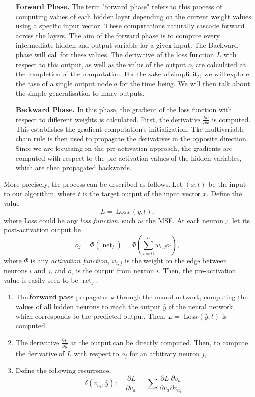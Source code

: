 \documentclass{tufte-handout}
\DeclareMathOperator{\net}{net}
\begin{document}
  \begin{enumerate}
    \item[\bf Forward Phase.] The term "forward phase" refers to this process of computing values of each hidden layer depending on the current weight values using a specific input vector. These computations naturally cascade forward across the layers. The aim of the forward phase is to compute every intermediate hidden and output variable for a given input. The Backward phase will call for these values. The derivative of the loss function $L$ with respect to this output, as well as the value of the output $o$, are calculated at the completion of the computation. For the sake of simplicity, we will explore the case of a single output node $o$ for the time being. We will then talk about the simple generalisation to many outputs. 

    \item[\bf Backward Phase.] In this phase, the gradient of the loss function with respect to different weights is calculated. First, the derivative $\frac{\partial {o}}{\partial {w}} {}$ is computed. This establishes the gradient computation's initialization. The multivariable chain rule is then used to propagate the derivatives in the opposite direction. Since we are focussing on the pre-activation approach, the gradients are computed with respect to the pre-activation values of the hidden variables, which are then propagated backwards.
  \end{enumerate}
  More precisely, the process can be described as follows. Let $(x,t)$ be the input to our algorithm, where $t$ is the target output of the input vector $x.$ Define the value
  $$L = \operatorname{Loss}(y,t),$$
  where Loss could be any \textit{loss function}, such as the MSE. At each neuron $j$, let its post-activation output be 
  $$o_j = \Phi (\net_j) = \Phi \left( \sum^{n}_{i=0}w_{i,j} o_i  \right) , $$
  where $\Phi$ is any \textit{activation function}, $w_{i,j}$ is the weight on the edge between neurons $i$ and $j$, and $o_i$ is the output from neuron $i.$ Then, the pre-activation value is easily seen to be $\net_j$.

  \begin{enumerate}
    \item The \textbf{forward pass} propagates $x$ through the neural network, computing the values of all hidden neurons to reach the output $\hat y$ of the neural network, which corresponds to the predicted output. Then, $L = \operatorname{Loss}(\hat y, t)$  is computed.
    \item The derivative $\frac{\partial {L}}{\partial {\hat y}}$ at the output can be directly computed. Then, to compute the derivative of $L$ with respect to $o_j$ for an arbitrary neuron $j$, 

    \item Define the following recurrence, 
    $$\delta (v_{a_i}, \hat y) := \frac{\partial {L}}{\partial {v_{a_i}}} {} = \sum^{}_{} \frac{\partial {L}}{\partial {v_a}} \frac{\partial {v_{a}}}{\partial {v_{a_i}}} {}   $$
  \end{enumerate}
\end{document}
